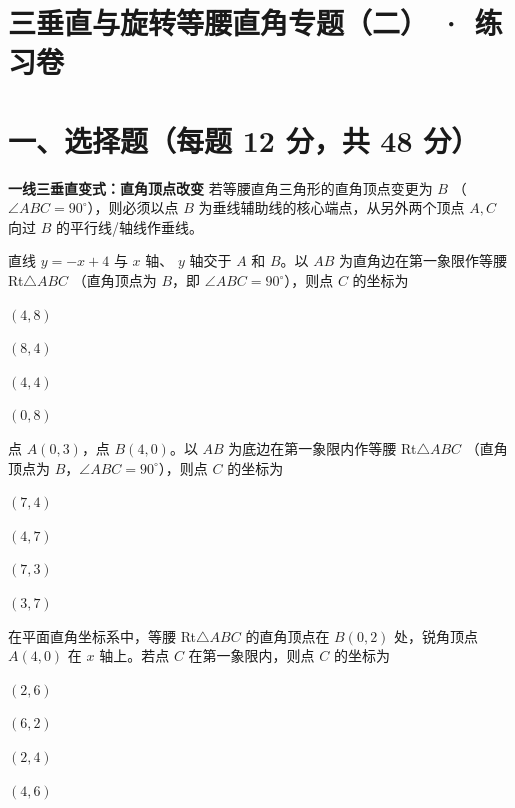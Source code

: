 \documentclass{exam-zh}
\begin{document}
\section*{三垂直与旋转等腰直角专题（二） · 练习卷}

\section*{一、选择题（每题 12 分，共 48 分）}


\begin{keyideabox}
  \textbf{一线三垂直变式：直角顶点改变}
  若等腰直角三角形的直角顶点变更为 $B$ （$\angle ABC = 90^\circ$），则必须以点 $B$ 为垂线辅助线的核心端点，从另外两个顶点 $A, C$ 向过 $B$ 的平行线/轴线作垂线。
\end{keyideabox}



\begin{question}[points=12]
  直线 $y = -x + 4$ 与 $x$ 轴、 $y$ 轴交于 $A$ 和 $B$。以 $AB$ 为直角边在第一象限作等腰 Rt$\triangle ABC$ （直角顶点为 $B$，即 $\angle ABC = 90^\circ$），则点 $C$ 的坐标为
  \begin{choices}
    \item $(4, 8)$
    \item $(8, 4)$
    \item $(4, 4)$
    \item $(0, 8)$
  \end{choices}
\end{question}



\begin{question}[points=12]
  点 $A(0, 3)$，点 $B(4, 0)$。以 $AB$ 为底边在第一象限内作等腰 Rt$\triangle ABC$ （直角顶点为 $B$，$\angle ABC = 90^\circ$），则点 $C$ 的坐标为
  \begin{choices}
    \item $(7, 4)$
    \item $(4, 7)$
    \item $(7, 3)$
    \item $(3, 7)$
  \end{choices}
\end{question}



\begin{question}[points=12]
  在平面直角坐标系中，等腰 Rt$\triangle ABC$ 的直角顶点在 $B(0, 2)$ 处，锐角顶点 $A(4, 0)$ 在 $x$ 轴上。若点 $C$ 在第一象限内，则点 $C$ 的坐标为
  \begin{choices}
    \item $(2, 6)$
    \item $(6, 2)$
    \item $(2, 4)$
    \item $(4, 6)$
  \end{choices}
\end{question}
\end{document}

